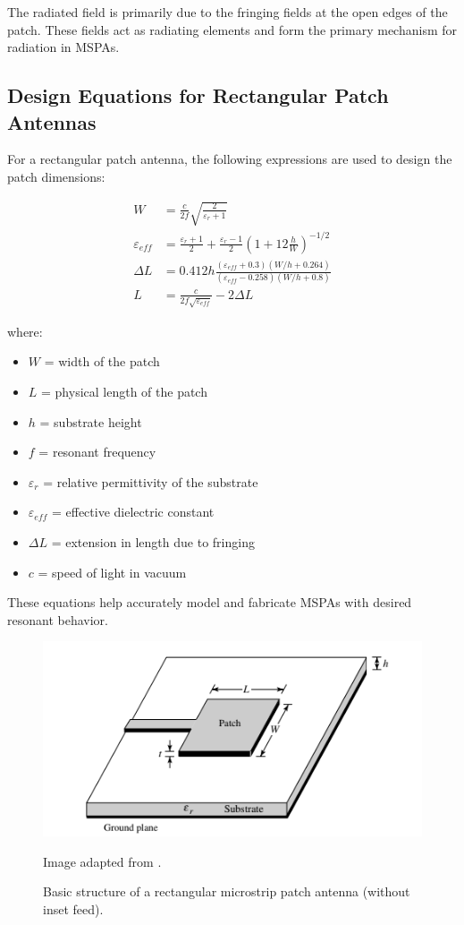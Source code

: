 The radiated field is primarily due to the fringing fields at the open edges of the patch. These fields act as radiating elements and form the primary mechanism for radiation in MSPAs.

\subsection*{Design Equations for Rectangular Patch Antennas}

For a rectangular patch antenna, the following expressions are used to design the patch dimensions:

\begin{align*}
W &= \frac{c}{2f} \sqrt{\frac{2}{\varepsilon_r + 1}} \\
\varepsilon_{eff} &= \frac{\varepsilon_r + 1}{2} + \frac{\varepsilon_r - 1}{2} \left(1 + 12 \frac{h}{W}\right)^{-1/2} \\
\Delta L &= 0.412 h \frac{(\varepsilon_{eff}+0.3)(W/h + 0.264)}{(\varepsilon_{eff}-0.258)(W/h + 0.8)} \\
L &= \frac{c}{2f \sqrt{\varepsilon_{eff}}} - 2\Delta L
\end{align*}

where:
\begin{itemize}
    \item $W$ = width of the patch
    \item $L$ = physical length of the patch
    \item $h$ = substrate height
    \item $f$ = resonant frequency
    \item $\varepsilon_r$ = relative permittivity of the substrate
    \item $\varepsilon_{eff}$ = effective dielectric constant
    \item $\Delta L$ = extension in length due to fringing
    \item $c$ = speed of light in vacuum
\end{itemize}

These equations help accurately model and fabricate MSPAs with desired resonant behavior.

\begin{figure}[H]
    \centering
    \includegraphics[width=1.0\textwidth]{figures/mspa_no_inset.png}
    \caption{Basic structure of a rectangular microstrip patch antenna (without inset feed).}
    \small Image adapted from \cite{balanis}.
    \label{fig:basic-mspa}
\end{figure}

